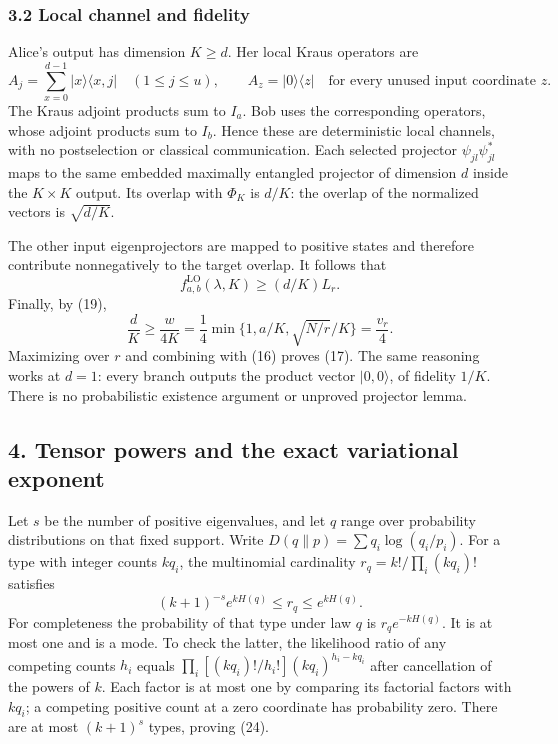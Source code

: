 \documentclass[11pt]{article}
\begin{document}
\hypertarget{local-channel-and-fidelity}{%
\subsubsection{3.2 Local channel and fidelity}\label{local-channel-and-fidelity}}

Alice's output has dimension \(K\ge d\). Her local Kraus operators are \[
 A_j=\sum_{x=0}^{d-1}|x\rangle\langle x,j|\quad(1\le j\le u),
 \qquad A_z=|0\rangle\langle z|\quad\text{for every unused input coordinate }z.
 \tag{21}
\] The Kraus adjoint products sum to \(I_a\). Bob uses the corresponding operators, whose adjoint products sum to \(I_b\). Hence these are deterministic local channels, with no postselection or classical communication. Each selected projector \(\psi_{jl}\psi_{jl}^*\) maps to the same embedded maximally entangled projector of dimension \(d\) inside the \(K\times K\) output. Its overlap with \(\Phi_K\) is \(d/K\): the overlap of the normalized vectors is \(\sqrt{d/K}\).

The other input eigenprojectors are mapped to positive states and therefore contribute nonnegatively to the target overlap. It follows that \[
 f_{a,b}^{\mathrm{LO}}(\lambda,K)\ge(d/K)L_r.
 \tag{22}
\] Finally, by (19), \[
 \frac dK\ge\frac{w}{4K}=\frac14\min\{1,a/K,\sqrt{N/r}/K\}
 =\frac{v_r}{4}.
 \tag{23}
\] Maximizing over \(r\) and combining with (16) proves (17). The same reasoning works at \(d=1\): every branch outputs the product vector \(|0,0\rangle\), of fidelity \(1/K\). There is no probabilistic existence argument or unproved projector lemma.

\hypertarget{tensor-powers-and-the-exact-variational-exponent}{%
\subsection{4. Tensor powers and the exact variational exponent}\label{tensor-powers-and-the-exact-variational-exponent}}

Let \(s\) be the number of positive eigenvalues, and let \(q\) range over probability distributions on that fixed support. Write \(D(q\|p)=\sum q_i\log(q_i/p_i)\). For a type with integer counts \(kq_i\), the multinomial cardinality \(r_q=k!/\prod_i(kq_i)!\) satisfies \[
 (k+1)^{-s}e^{kH(q)}\le r_q\le e^{kH(q)}.
 \tag{24}
\] For completeness the probability of that type under law \(q\) is \(r_q e^{-kH(q)}\). It is at most one and is a mode. To check the latter, the likelihood ratio of any competing counts \(h_i\) equals \(\prod_i[(kq_i)!/h_i!](kq_i)^{h_i-kq_i}\) after cancellation of the powers of \(k\). Each factor is at most one by comparing its factorial factors with \(kq_i\); a competing positive count at a zero coordinate has probability zero. There are at most \((k+1)^s\) types, proving (24).
\end{document}

